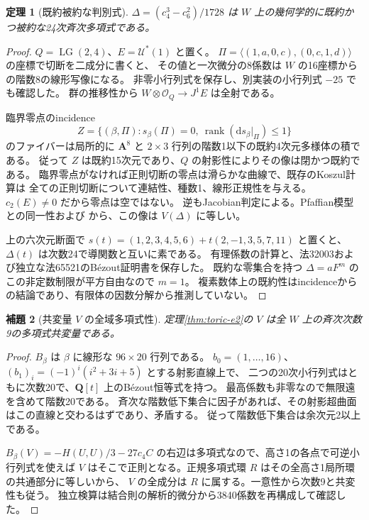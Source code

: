 \documentclass[11pt,a4paper]{ltjsarticle}
\newcommand{\QQ}{\mathbf Q}
\renewcommand{\AA}{\mathbf A}
\newcommand{\dd}{\mathrm d}
\DeclareMathOperator{\rank}{rank}
\newtheorem{theorem}{定理}[section]
\newtheorem{lemma}[theorem]{補題}
\theoremstyle{remark}
\begin{document}
\begin{theorem}[既約被約な判別式]\label{thm:curve-discriminant}
$\Delta=(c_4^3-c_6^2)/1728$ は $W$ 上の幾何学的に既約かつ被約な24次斉次多項式である。
\end{theorem}
\begin{proof}
$Q=\operatorname{LG}(2,4)$、$E=\mathcal U^*(1)$ と置く。
$\Pi=\langle(1,a,0,c),(0,c,1,d)\rangle$ の座標で切断を二成分に書くと、
その値と一次微分の8係数は $W$ の16座標からの階数8の線形写像になる。
非零小行列式を保存し、別実装の小行列式 $-25$ でも確認した。
群の推移性から $W\otimes\mathcal O_Q\to J^1E$ は全射である。

臨界零点のincidence
\[
 Z=\{(\beta,\Pi):s_\beta(\Pi)=0,\ \rank(\dd s_\beta|_\Pi)\leq1\}
\]
のファイバーは局所的に $\AA^8$ と $2\times3$ 行列の階数1以下の既約4次元多様体の積である。
従って $Z$ は既約15次元であり、$Q$ の射影性によりその像は閉かつ既約である。
臨界零点がなければ正則切断の零点は滑らかな曲線で、既存のKoszul計算は
全ての正則切断について連結性、種数1、線形正規性を与える。
$c_2(E)\ne0$ だから零点は空ではない。
逆もJacobian判定による。Pfaffian模型との同一性および
\cite[Theorem 2.1(ii)]{fisher-sadek-new}から、この像は $V(\Delta)$ に等しい。

上の六次元断面で
$s(t)=(1,2,3,4,5,6)+t(2,-1,3,5,7,11)$ と置くと、
$\Delta(t)$ は次数24で導関数と互いに素である。
有理係数の計算と、法32003および独立な法65521のB\'ezout証明書を保存した。
既約な零集合を持つ $\Delta=aF^m$ のこの非定数制限が平方自由なので $m=1$。
複素数体上の既約性はincidenceからの結論であり、有限体の因数分解から推測していない\cite{discriminant-new}。
\end{proof}

\begin{lemma}[共変量 $V$ の全域多項式性]\label{lem:c9-global}
定理\ref{thm:toric-e2}の $V$ は全 $W$ 上の斉次次数9の多項式共変量である。
\end{lemma}
\begin{proof}
$B_\beta$ は $\beta$ に線形な $96\times20$ 行列である。
$b_0=(1,\ldots,16)$、$(b_1)_i=(-1)^i(i^2+3i+5)$ とする射影直線上で、
二つの20次小行列式はともに次数20で、$\QQ[t]$ 上のB\'ezout恒等式を持つ。
最高係数も非零なので無限遠を含めて階数20である。
斉次な階数低下集合に因子があれば、その射影超曲面はこの直線と交わるはずであり、矛盾する。
従って階数低下集合は余次元2以上である。

$B_\beta(V)=-H(U,U)/3-27c_4C$ の右辺は多項式なので、高さ1の各点で可逆小行列式を使えば
$V$ はそこで正則となる。正規多項式環 $R$ はその全高さ1局所環の共通部分に等しいから、
$V$ の全成分は $R$ に属する。一意性から次数9と共変性も従う。
独立検算は結合則の解析的微分から3840係数を再構成して確認した\cite{c9-new}。
\end{proof}
\end{document}
